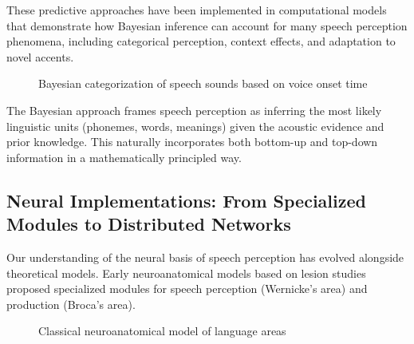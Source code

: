 \documentclass[12pt,a4paper]{article}
\begin{document}
These predictive approaches have been implemented in computational models that demonstrate how Bayesian inference can account for many speech perception phenomena, including categorical perception, context effects, and adaptation to novel accents.

\begin{figure}[h]
\centering
{}
\caption{Bayesian categorization of speech sounds based on voice onset time}
\label{fig:bayesian_vot}
\end{figure}

The Bayesian approach frames speech perception as inferring the most likely linguistic units (phonemes, words, meanings) given the acoustic evidence and prior knowledge. This naturally incorporates both bottom-up and top-down information in a mathematically principled way.

\subsection{Neural Implementations: From Specialized Modules to Distributed Networks}

Our understanding of the neural basis of speech perception has evolved alongside theoretical models. Early neuroanatomical models based on lesion studies proposed specialized modules for speech perception (Wernicke's area) and production (Broca's area).

\begin{figure}[h]
\centering
{}
\caption{Classical neuroanatomical model of language areas}
\label{fig:classical_brain}
\end{figure}
\end{document}
